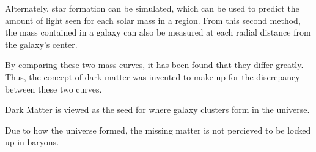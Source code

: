 Alternately, star formation can be simulated, which can be used to predict the amount of light seen for each solar mass in a region.
From this second method, the mass contained in a galaxy can also be measured at each radial distance from the galaxy's center.

By comparing these two mass curves, it has been found that they differ greatly.
Thus, the concept of dark matter was invented to make up for the discrepancy between these two curves.




Dark Matter is viewed as the seed for where galaxy clusters form in the universe.


Due to how the universe formed, the missing matter is not percieved to be locked up in baryons.

